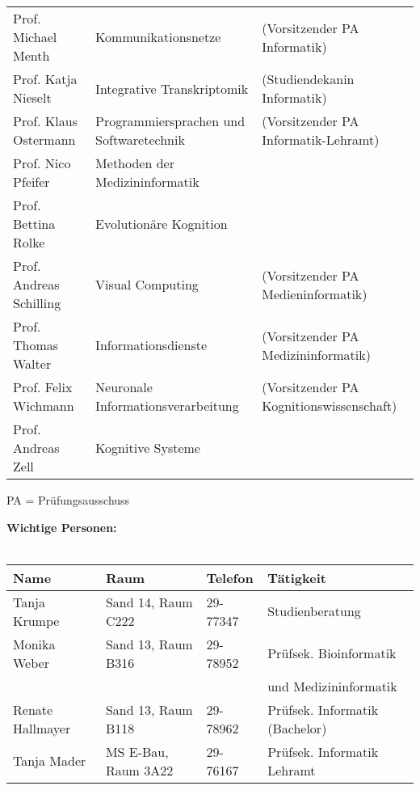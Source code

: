 \begin{tabular}{|lll|}
Prof. Michael Menth           & Kommunikationsnetze 		& (Vorsitzender PA Informatik)\\
Prof. Katja Nieselt	          & Integrative Transkriptomik	 & (Studiendekanin Informatik\footnotemark)\\
Prof. Klaus Ostermann	      & Programmiersprachen und Softwaretechnik &(Vorsitzender PA Informatik-Lehramt) \\
Prof. Nico Pfeifer			  & Methoden der Medizininformatik &\\
Prof. Bettina Rolke 		  & Evolutionäre Kognition &\\
Prof. Andreas Schilling       & Visual Computing &(Vorsitzender PA Medieninformatik)\\
Prof. Thomas Walter           & Informationsdienste			 & (Vorsitzender PA Medizininformatik) \\
Prof. Felix Wichmann          & Neuronale Informationsverarbeitung &  (Vorsitzender PA Kognitionswissenschaft)	\\
Prof. Andreas Zell            & Kognitive Systeme 		 &\\
\hline
\end{tabular}
\scriptsize{PA = Prüfungsausschuss}


\textbf{Wichtige Personen:}\\\\
\begin{tabular}{|llll|}
\hline
Name                  & Raum		       & Telefon    & Tätigkeit \hfill\\
\hline
\hline
Tanja Krumpe	      & Sand 14, Raum C222    & 29-77347   & Studienberatung\\
Monika Weber          & Sand 13, Raum B316    & 29-78952   & Prüfsek. Bioinformatik\\
                      &                       &            & und Medizininformatik \\
Renate Hallmayer      & Sand 13, Raum B118    & 29-78962   & Prüfsek. Informatik (Bachelor) \\
Tanja Mader      & MS E-Bau, Raum 3A22    & 29-76167   & Prüfsek. Informatik Lehramt \\
\hline
\end{tabular} \\

